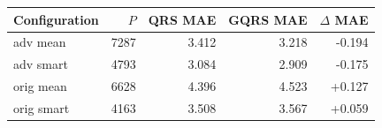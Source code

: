 \begin{tabular}{lrrrr}
\toprule
Configuration & $P$ & QRS MAE & GQRS MAE & $\Delta$ MAE \\
\midrule
adv mean & 7287 & 3.412 & 3.218 & -0.194 \\
adv smart & 4793 & 3.084 & 2.909 & -0.175 \\
orig mean & 6628 & 4.396 & 4.523 & +0.127 \\
orig smart & 4163 & 3.508 & 3.567 & +0.059 \\
\bottomrule
\end{tabular}
